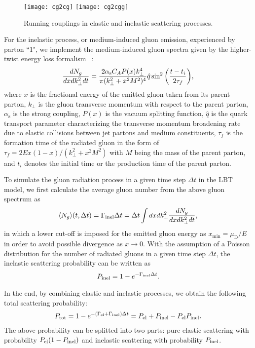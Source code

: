 \documentclass[aps,superscriptaddress,prc,twocolumn,nofootinbib]{revtex4}
\begin{document}
\begin{figure*}[htb]
\texttt{[image: cg2cg]}
\texttt{[image: cg2cgg]}
\caption{Running couplings in elastic and inelastic scattering processes.}
\label{cg_el_inel}
\end{figure*}


For the inelastic process, or medium-induced gluon emission, experienced by parton ``1", we implement the medium-induced gluon spectra given by the higher-twist energy loss formalism ~\cite{Wang:2001ifa, Zhang:2003wk}:
\begin{align}
\frac{dN_g}{dx dk_\perp^2 dt}=\frac{2 \alpha_{\rm s} C_A P(x)k_\perp^4}{\pi (k_\perp^2+x^2M^2)^4} \hat{q} \sin^2 \bigg(\frac{t-t_i}{2\tau_f} \bigg),
\end{align}
where $x$ is the fractional energy of the emitted gluon taken from its parent parton, $k_\perp$ is the gluon transverse momentum with respect to the parent parton, $\alpha_\mathrm{s}$ is the strong coupling, $P(x)$ is the vacuum splitting function, $\hat{q}$ is the quark transport parameter characterizing the transverse momentum broadening rate due to elastic collisions between jet partons and medium constituents, $\tau_f$ is the formation time of the radiated gluon in the form of $\tau_f=2Ex (1-x)/(k_\perp^2+x^2 M^2)$ with $M$ being the mass of the parent parton, and $t_i$ denotes the initial time or the production time of the parent parton.

To simulate the gluon radiation process in a given time step $\Delta t$ in the LBT model, we first calculate the average gluon number from the above gluon spectrum as
\begin{align}
	\langle N_g \rangle(t, \Delta t) = \Gamma_{\rm inel} \Delta t = \Delta t \int dx dk_\perp^2 \frac{dN_g}{dx dk_\perp^2 dt},
\end{align}
in which a lower cut-off is imposed for the emitted gluon energy as $x_\mathrm{min}=\mu_\mathrm{D}/E$ in order to avoid possible divergence as $x\rightarrow 0$.
With the assumption of a Poisson distribution for the number of radiated gluons in a given time step $\Delta t$, the inelastic scattering probability can be written as
\begin{align}
P_\mathrm{inel}=1-e^{-\Gamma_{\rm inel}\Delta t}.
\end{align}

In the end, by combining elastic and inelastic processes, we obtain the following total scattering probability:
\begin{align}
	P_{\rm tot} = 1-e^{-(\Gamma_{\rm el}+\Gamma_{\rm inel})\Delta t} = P_{\rm el} + P_{\rm inel} - P_{\rm el} P_{\rm inel}.
\end{align}
The above probability can be splitted into two parts: pure elastic scattering with probability  $P_{\rm el} (1 - P_{\rm inel})$ and inelastic scattering with probability $P_{\rm inel}$.
\end{document}
